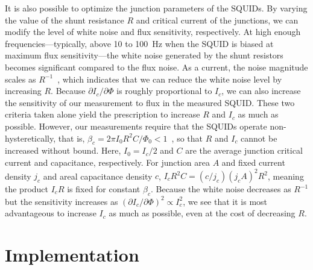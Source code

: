 It is also possible to optimize the junction parameters of the SQUIDs. By varying the value of the shunt resistance $R$ and critical current of the junctions, we can modify the level of white noise and flux sensitivity, respectively. At high enough frequencies---typically, above 10 to 100~Hz when the SQUID is biased at maximum flux sensitivity---the white noise generated by the shunt resistors becomes significant compared to the flux noise. As a current, the noise magnitude scales as $R^{-1}$~\citep{Likharev:1972}, which indicates that we can reduce the white noise level by increasing $R$. Because $\partial I_c/\partial\Phi$ is roughly proportional to $I_c$, we can also increase the sensitivity of our measurement to flux in the measured SQUID. These two criteria taken alone yield the prescription to increase $R$ and $I_c$ as much as possible. However, our measurements require that the SQUIDs operate non-hysteretically, that is, $\beta_c = 2\pi I_0 R^2 C/\Phi_0 < 1$~\citep{Stewart:1968,McCumber:1968}, so that $R$ and $I_c$ cannot be increased without bound. Here, $I_0 = I_c/2$ and $C$ are the average junction critical current and capacitance, respectively. For junction area $A$ and fixed current density $j_c$ and areal capacitance density $c$, $I_cR^2 C = (c/j_c)(j_c A)^2 R^2$, meaning the product $I_cR$ is fixed for constant $\beta_c$. Because the white noise decreases as $R^{-1}$ but the sensitivity increases as $(\partial I_c/\partial\Phi)^2 \propto I_c^2$, we see that it is most advantageous to increase $I_c$ as much as possible, even at the cost of decreasing $R$.

\section{Implementation}

